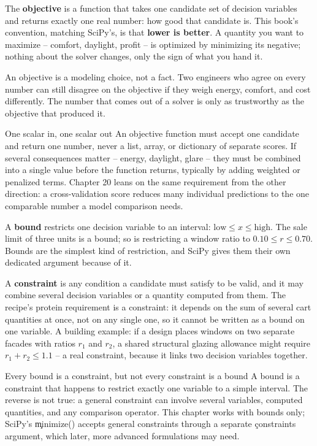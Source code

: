 
The \textbf{objective} is a function that takes one candidate set of decision
variables and returns exactly one real number: how good that candidate is. This
book's convention, matching SciPy's, is that \textbf{lower is better}. A
quantity you want to maximize -- comfort, daylight, profit -- is optimized by
minimizing its negative; nothing about the solver changes, only the sign of
what you hand it.

An objective is a modeling choice, not a fact. Two engineers who agree on every
number can still disagree on the objective if they weigh energy, comfort, and
cost differently. The number that comes out of a solver is only as trustworthy
as the objective that produced it.

\begin{ExplainBox}{One scalar in, one scalar out}
An objective function must accept one candidate and return one number, never a
list, array, or dictionary of separate scores. If several consequences matter
-- energy, daylight, glare -- they must be combined into a single value before
the function returns, typically by adding weighted or penalized terms. Chapter
20 leans on the same requirement from the other direction: a cross-validation
score reduces many individual predictions to the one comparable number a
model comparison needs.
\end{ExplainBox}


A \textbf{bound} restricts one decision variable to an interval:
$\text{low} \le x \le \text{high}$. The sale limit of three units is a bound;
so is restricting a window ratio to $0.10 \le r \le 0.70$. Bounds are the
simplest kind of restriction, and SciPy gives them their own dedicated
argument because of it.

A \textbf{constraint} is any condition a candidate must satisfy to be valid,
and it may combine several decision variables or a quantity computed from
them. The recipe's protein requirement is a constraint: it depends on the sum
of several cart quantities at once, not on any single one, so it cannot be
written as a bound on one variable. A building example: if a design places
windows on two separate facades with ratios $r_1$ and $r_2$, a shared
structural glazing allowance might require $r_1 + r_2 \le 1.1$ -- a real
constraint, because it links two decision variables together.

\begin{ExplainBox}{Every bound is a constraint, but not every constraint is a bound}
A bound is a constraint that happens to restrict exactly one variable to a
simple interval. The reverse is not true: a general constraint can involve
several variables, computed quantities, and any comparison operator. This
chapter works with bounds only; SciPy's \c{minimize()} accepts general
constraints through a separate \c{constraints} argument, which later,
more advanced formulations may need.
\end{ExplainBox}

